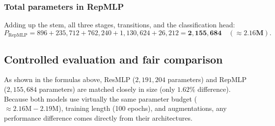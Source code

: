 \subsubsection{Total parameters in RepMLP}
Adding up the stem, all three stages, transitions, and the classification head:
\begin{equation}
    P_{\text{RepMLP}} = 896 + 235,712 + 762,240 + 1,130,624 + 26,212 = \mathbf{2,155,684} \quad (\approx \mathbf{2.16\text{M}}).
\end{equation}

\begin{table}[t]
\centering
{}
\vspace{0.6em}
\caption{Layer-by-layer parameter breakdown of RepMLP ($C=[64, 128, 256], B=[2, 4, 2]$).}
\label{tab:repmlp_breakdown}
\end{table}

\subsection{Controlled evaluation and fair comparison}
As shown in the formulas above, ResMLP ($2,191,204$ parameters) and RepMLP ($2,155,684$ parameters) are matched closely in size (only $1.62\%$ difference). Because both models use virtually the same parameter budget ($\approx 2.16\text{M} - 2.19\text{M}$), training length (100 epochs), and augmentations, any performance difference comes directly from their architectures.
